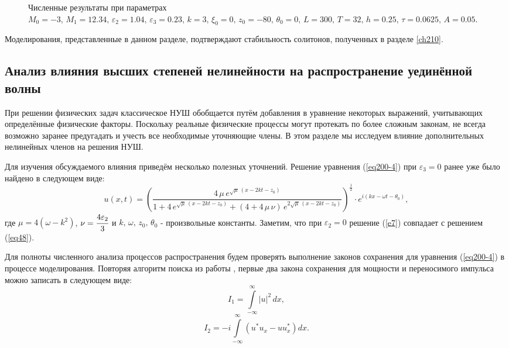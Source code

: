 \documentclass[14pt,a4paper]{extreport}
\begin{document}
\begin{figure}[H]
\begin{center}
\begin{minipage}[h]{0.48\linewidth}
					\end{minipage}
				\end{center}
				\caption{Численные результаты при параметрах \(M_{0}=-3,\,M_{1}=12.34,\,\varepsilon_{2}=1.04,\,\varepsilon_{3}=0.23,\, k=3,\, \xi_{0}=0,\,z_{0}=-80,\, \theta_{0}=0,\, L=300,\, T=32,\, h=0.25,\, \tau=0.0625,\,A=0.05\).}
				\label{fig172}
			\end{figure}

			Моделирования, представленные в данном разделе, подтверждают стабильность солитонов, полученных в разделе \ref{ch210}.
		\subsection{Анализ влияния высших степеней нелинейности на распространение уединённой волны}\label{ch340}
			При решении физических задач классическое НУШ обобщается путём добавления в уравнение некоторых выражений, учитывающих определённые физические факторы. Поскольку реальные физические процессы могут протекать по более сложным законам, не всегда возможно заранее предугадать и учесть все необходимые уточняющие члены. В этом разделе мы исследуем влияние дополнительных нелинейных членов на решения НУШ. 
			
			Для изучения обсуждаемого влияния приведём несколько полезных уточнений.
			Решение уравнения (\ref{eq200-4}) при \(\varepsilon_{3}=0\) ранее уже было найдено в следующем виде:
			\begin{equation}\label{e7}
				u(x,t)=\left(\frac{4\,\mu\, e^{\sqrt{\mu}\,(x-2kt-z_{0})}}{1+4\, e^{\sqrt{\mu}\,(x-2kt-z_{0})}+(4+4\, \mu\, \nu) \,e^{2\sqrt{\mu}\,(x-2kt-z_{0})}}\right)^{\frac{1}{2}}\cdot e^{i(kx-\omega t-\theta_{0})},
			\end{equation}
			где \(\mu=4(\omega-k^{2})\), \(\nu=\cfrac{4 \varepsilon_{2}}{3}\) и \( k,\, \omega,\, z_{0},\, \theta_{0}\) - произвольные константы. Заметим, что при \(\varepsilon_{2}=0\) решение (\ref{e7}) совпадает с решением (\ref{eq48}).

			Для полноты численного анализа процессов распространения будем проверять выполнение законов сохранения для уравнения (\ref{eq200-4}) в процессе моделирования. Повторяя алгоритм поиска из работы \cite{KudrNifHierarchy}, первые два закона сохранения для мощности и переносимого импульса можно записать в следующем виде:
			\begin{equation}\label{eq320-2}
				I_{1}=\int\limits_{-\infty}^{\infty} |u|^{2} \, dx,
			\end{equation}
			\begin{equation}\label{eq320-3}
				I_{2}=-i \int\limits_{-\infty}^{\infty}\left(u^{*}u_{x}-u u^{*}_{x}\right) dx.
			\end{equation}
\end{document}
